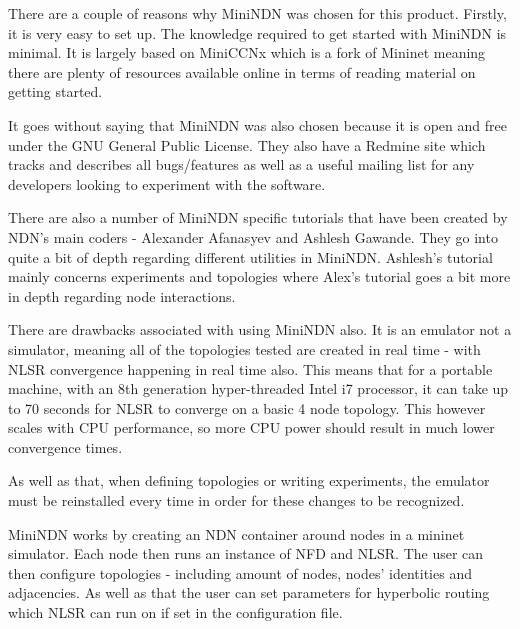 There are a couple of reasons why MiniNDN was chosen for this product. Firstly, it is very easy to set up. The knowledge required to get started with MiniNDN is minimal. It is largely based on MiniCCNx which is a fork of  Mininet meaning there are plenty of resources available online in terms of reading material on getting started.

It goes without saying that MiniNDN was also chosen because it is open and free under the GNU General Public License. They also have a Redmine site which tracks and describes all bugs/features as well as a useful mailing list for any developers looking to experiment with the software.

 There are also a number of MiniNDN specific tutorials that have been created by NDN's main coders - Alexander Afanasyev and Ashlesh Gawande. They go into quite a bit of depth regarding different utilities in MiniNDN. Ashlesh's tutorial mainly concerns experiments and topologies where Alex's tutorial goes a bit more in depth regarding node interactions. 
 
 There are drawbacks associated with using MiniNDN also. It is an emulator not a simulator, meaning all of the topologies tested are created in real time - with NLSR convergence happening in real time also. This means that for a portable machine, with an 8th generation hyper-threaded Intel i7 processor, it can take up to 70 seconds for NLSR to converge on a basic 4 node topology. This however scales with CPU performance, so more CPU power should result in much lower convergence times. 
 
 As well as that, when defining topologies or writing experiments, the emulator must be reinstalled every time in order for these changes to be recognized.
 
 MiniNDN works by creating an NDN container around nodes in a mininet simulator. Each node then runs an instance of NFD and NLSR. The user can then configure topologies - including amount of nodes, nodes' identities and adjacencies. As well as that the user can set parameters for hyperbolic routing which NLSR can run on if set in the configuration file. 
 

